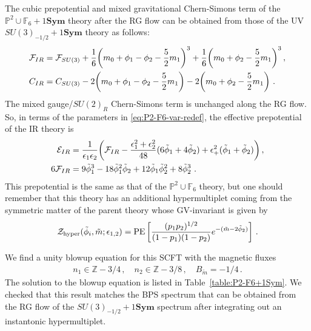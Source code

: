 The cubic prepotential and mixed gravitational Chern-Simons term of the $ \mathbb{P}^2 \cup \mathbb{F}_6 + 1\mathbf{Sym} $ theory after the RG flow can be obtained from those of the UV $ SU(3)_{-1/2} + 1\mathbf{Sym} $ theory as follows:
\begin{align}
\mathcal{F}_{IR} &= \mathcal{F}_{SU(3)} + \frac{1}{6} \qty(m_0 + \phi_1 - \phi_2 - \frac{5}{2}m_1)^3 + \frac{1}{6} \qty(m_0 + \phi_2 - \frac{5}{2}m_1)^3 \, , \\
C_{IR} &= C_{SU(3)} - 2 \qty(m_0 + \phi_1 - \phi_2 - \frac{5}{2}m_1) - 2 \qty(m_0 + \phi_2 - \frac{5}{2}m_1) \ .
\end{align}
The mixed gauge/$ SU(2)_R $ Chern-Simons term is unchanged along the RG flow. So, in terms of the parameters in \eqref{eq:P2-F6-var-redef}, the effective prepotential of the IR theory is
\begin{align}
\mathcal{E}_{IR} &= \frac{1}{\epsilon_1 \epsilon_2} \qty(\mathcal{F}_{IR} - \frac{\epsilon_1^2 + \epsilon_2^2}{48}(6\tilde{\phi}_1 + 4\tilde{\phi}_2) + \epsilon_+^2 (\tilde{\phi}_1 + \tilde{\phi}_2)) \, , \nonumber \\
6\mathcal{F}_{IR} &= 9\tilde{\phi}_1^3 - 18\tilde{\phi}_1^2 \tilde{\phi}_2 + 12\tilde{\phi}_1 \tilde{\phi}_2^2 + 8\tilde{\phi}_2^3 \ .
\end{align}
This prepotential is the same as that of the $ \mathbb{P}^2 \cup \mathbb{F}_6 $ theory, but one should remember that this theory has an additional hypermultiplet coming from the symmetric matter of the parent theory whose GV-invariant is given by
\begin{align}
\mathcal{Z}_{\mathrm{hyper}}(\tilde{\phi}_i, \tilde{m}; \epsilon_{1,2})
= \operatorname{PE} \qty[\frac{(p_1 p_2)^{1/2}}{(1-p_1)(1-p_2)} e^{-(\tilde{m}-2\tilde{\phi}_2)}] \ .
\end{align}

We find a unity blowup equation for this SCFT with the magnetic fluxes
\begin{align}
n_1 \in \mathbb{Z} - 3/4 \, , \quad
n_2 \in \mathbb{Z} - 3/8 \, , \quad
B_{\tilde{m}} = -1/4 \, .
\end{align}
The solution to the blowup equation is listed in Table~\ref{table:P2-F6+1Sym}. We checked that this result matches the BPS spectrum that can be obtained from the RG flow of the $ SU(3)_{-1/2} + 1\mathbf{Sym} $ spectrum after integrating out an instantonic hypermultiplet.

